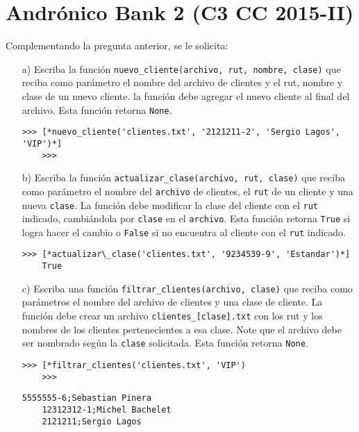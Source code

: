 \section{Andrónico Bank 2 (C3 CC 2015-II)}

  Complementando la pregunta anterior,
  se le solicita:
  
  \begin{itemize}
  \item[a)]
    Escriba la función
    \texttt{nuevo\_cliente(archivo, rut, nombre, clase)}
    que reciba como parámetro el nombre del archivo de clientes
    y el rut,
    nombre y clase de un nuevo cliente.
    la función debe agregar el nuevo cliente al final del archivo.
    Esta función retorna \texttt{None}.
    
    \begin{lstlisting}[style = consola]
    >>> [*nuevo_cliente('clientes.txt', '2121211-2', 'Sergio Lagos', 'VIP')*]
    >>> 
    \end{lstlisting}
  \item[b)]
    Escriba la función
    \texttt{actualizar\_clase(archivo, rut, clase)}
    que reciba como parámetro el nombre del
    \texttt{archivo} de clientes,
    el \texttt{rut} de un cliente y una nueva \texttt{clase}.
    La función debe modificar la clase del cliente
    con el \texttt{rut} indicado,
    cambiándola por \texttt{clase} en el \texttt{archivo}.
    Esta función retorna \texttt{True} si logra
    hacer el cambio o \texttt{False} si no encuentra
    al cliente con el \texttt{rut} indicado.
    
    \begin{lstlisting}[style = consola]
    >>> [*actualizar\_clase('clientes.txt', '9234539-9', 'Estandar')*]
    True
    \end{lstlisting}
  \item[c)]
    Escriba una función
    \texttt{filtrar\_clientes(archivo, clase)}
    que reciba como parámetros el nombre del archivo de clientes
    y una clase de cliente.
    La función debe crear un archivo
    \texttt{clientes\_[clase].txt}
    con los rut y los nombres de los clientes
    pertenecientes a esa clase.
    Note que el archivo debe ser nombrado según la
    \texttt{clase} solicitada.
    Esta función retorna \texttt{None}.
    
    \begin{lstlisting}[style = consola]
    >>> [*filtrar_clientes('clientes.txt', 'VIP')
    >>>
    \end{lstlisting}
    
    \begin{lstlisting}[style = consola, caption = clientes\_VIP.txt]
    5555555-6;Sebastian Pinera
    12312312-1;Michel Bachelet
    2121211;Sergio Lagos
    \end{lstlisting}
  \end{itemize}